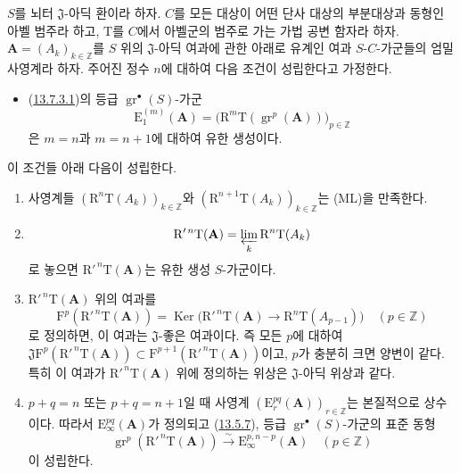 \begin{proposition}[13.7.7]
\label{0.13.7.7-fr}
$S$를 뇌터 $\mathfrak J$-아딕 환이라 하자. $C$를 모든 대상이 어떤
단사 대상의 부분대상과 동형인 아벨 범주라 하고, $\mathrm T$를 $C$에서
아벨군의 범주로 가는 가법 공변 함자라 하자.
$\mathbf A=(A_k)_{k\in\mathbb Z}$를 $S$ 위의 $\mathfrak J$-아딕
여과에 관한 아래로 유계인 여과 $S$-$C$-가군들의 엄밀 사영계라 하자.
주어진 정수 $n$에 대하여 다음 조건이 성립한다고 가정한다.
\begin{itemize}
\item[$(\mathrm F_n)$] (\hyperref[0.13.7.3.1-fr]{13.7.3.1})의 등급
$\operatorname{gr}^\bullet(S)$-가군
\[
\mathrm E_1^{(m)}(\mathbf A)=
\bigl(\mathrm R^m\mathrm T(\operatorname{gr}^p(\mathbf A))\bigr)_{p\in\mathbb Z}
\]
은 $m=n$과 $m=n+1$에 대하여 유한 생성이다.
\end{itemize}
이 조건들 아래 다음이 성립한다.
\begin{enumerate}
\item[\rm(i)] 사영계들
$(\mathrm R^n\mathrm T(A_k))_{k\in\mathbb Z}$와
$(\mathrm R^{n+1}\mathrm T(A_k))_{k\in\mathbb Z}$는 (ML)을 만족한다.
\item[\rm(ii)]
\[
\mathrm R'^{\,n}\mathrm T(\mathbf A)=
\varprojlim_k\mathrm R^n\mathrm T(A_k)
\]
로 놓으면 $\mathrm R'^{\,n}\mathrm T(\mathbf A)$는 유한 생성
$S$-가군이다.
\item[\rm(iii)] $\mathrm R'^{\,n}\mathrm T(\mathbf A)$ 위의 여과를
\[
\mathrm F^p(\mathrm R'^{\,n}\mathrm T(\mathbf A))=
\operatorname{Ker}\bigl(\mathrm R'^{\,n}\mathrm T(\mathbf A)
\longrightarrow\mathrm R^n\mathrm T(A_{p-1})\bigr)
\quad(p\in\mathbb Z)
\]
로 정의하면, 이 여과는 $\mathfrak J$-좋은 여과이다. 즉 모든 $p$에
대하여
$\mathfrak J\mathrm F^p(\mathrm R'^{\,n}\mathrm T(\mathbf A))
\subset\mathrm F^{p+1}(\mathrm R'^{\,n}\mathrm T(\mathbf A))$이고,
$p$가 충분히 크면 양변이 같다. 특히 이 여과가
$\mathrm R'^{\,n}\mathrm T(\mathbf A)$ 위에 정의하는 위상은
$\mathfrak J$-아딕 위상과 같다.
\item[\rm(iv)] $p+q=n$ 또는 $p+q=n+1$일 때 사영계
$(\mathrm E_r^{pq}(\mathbf A))_{r\in\mathbb Z}$는 본질적으로 상수이다.
따라서 $\mathrm E_\infty^{pq}(\mathbf A)$가 정의되고
(\hyperref[0.13.5.7-fr]{13.5.7}), 등급
$\operatorname{gr}^\bullet(S)$-가군의 표준 동형
\begin{equation}
\label{0.13.7.7.1-fr}
\tag{13.7.7.1}
\operatorname{gr}^p(\mathrm R'^{\,n}\mathrm T(\mathbf A))
\xrightarrow{\sim}\mathrm E_\infty^{p,n-p}(\mathbf A)
\quad(p\in\mathbb Z)
\end{equation}
이 성립한다.
\end{enumerate}
\end{proposition}

